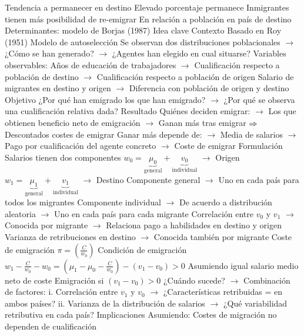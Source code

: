 \documentclass{nuevotema}
\begin{document}
\begin{esquemal}
			\3 Tendencia a permanecer en destino
				\4 Elevado porcentaje permanece
				\4 Inmigrantes tienen más posibilidad de re-emigrar
				\4[] En relación a población en país de destino
		\2 Determinantes: modelo de Borjas (1987)
			\3 Idea clave
				\4 Contexto
				\4[] Basado en Roy (1951)
				\4[] Modelo de autoselección
				\4[] Se observan dos distribuciones poblacionales
				\4[] $\to$ ¿Cómo se han generado?
				\4[] $\to$ ¿Agentes han elegido en cual situarse?
				\4 Variables observables:
				\4[] Años de educación de trabajadores
				\4[] $\to$ Cualificación respecto a población de destino
				\4[] $\to$ Cualificación respecto a población de origen
				\4[] Salario de migrantes en destino y origen
				\4[] $\to$ Diferencia con población de origen y destino
				\4 Objetivo
				\4[] ¿Por qué han emigrado los que han emigrado?
				\4[] $\to$ ¿Por qué se observa una cualificación relativa dada?
				\4 Resultado
				\4[] Quiénes deciden emigrar:
				\4[] $\to$ Los que obtienen beneficio neto de emigración
				\4[] $\to$ Ganan más tras emigrar
				\4[] $\Rightarrow$ Descontados costes de emigrar
				\4[] Ganar más depende de:
				\4[] $\to$ Media de salarios
				\4[] $\to$ Pago por cualificación del agente concreto
				\4[] $\to$ Coste de emigrar
			\3 Formulación
				\4 Salarios tienen dos componentes
				\4[] $w_0 = \underbrace{\mu_0}_\text{general} + \underbrace{v_0}_\text{individual}$ $\to$ Origen
				\4[] $w_1 = \underbrace{\mu_1}_\text{general} + \underbrace{v_1}_\text{individual}$ $\to$ Destino
				\4[] Componente general
				\4[] $\to$ Uno en cada país para todos los migrantes
				\4[] Componente individual
				\4[] $\to$ De acuerdo a distribución aleatoria
				\4[] $\to$ Uno en cada país para cada migrante
				\4[] Correlación entre $v_0$ y $v_1$
				\4[] $\to$ Conocida por migrante
				\4[] $\to$ Relaciona pago a habilidades en destino y origen
				\4[] Varianza de retribuciones en destino
				\4[] $\to$ Conocida también por migrante
				\4 Coste de emigración
				\4[] $\pi = \left( \frac{C}{w_0} \right)$
				\4 Condición de emigración
				\4[] $w_1 - \frac{C}{w_0}- w_0 = \left( \mu_1 - \mu_0 - \frac{C}{w_0} \right) - (v_1 - v_0) > 0$
				\4 Asumiendo igual salario medio neto de coste
				\4[] Emigración si $(v_1 -v_0)>0$
				\4[] ¿Cuándo sucede? $\to$ Combinación de factores:
				\4[] i. Correlación entre $v_1$ y $v_0$
				\4[] $\to$ ¿Características retribuidas = en ambos países?
				\4[] ii. Varianza de la distribución de salarios
				\4[] $\to$ ¿Qué variabilidad retributiva en cada país?
			\3 Implicaciones
				\4 Asumiendo:
				\4[] Costes de migración no dependen de cualificación

\end{esquemal}
\end{document}
